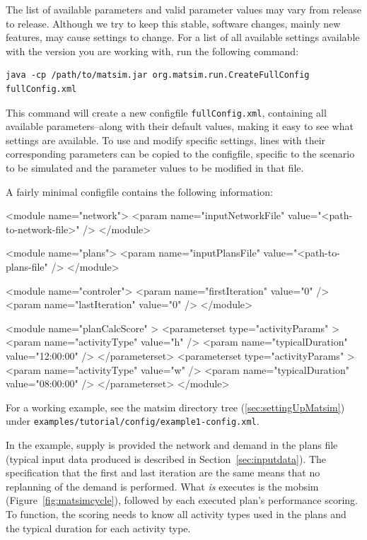 The list of available parameters and valid parameter values may vary from release to release. Although we try to keep this stable,
software changes, mainly new features, may cause settings to change. For a list of all available settings available with the version you are working with, run the following command:
\begin{lstlisting}
java -cp /path/to/matsim.jar org.matsim.run.CreateFullConfig fullConfig.xml
\end{lstlisting}
%
This command will create a new \gls{configfile} \lstinline|fullConfig.xml|, containing all available parameters--along with their default values, making it easy to see what settings are available. To use and modify specific settings, lines with their corresponding parameters can be copied to the \gls{configfile}, specific to the \gls{scenario} to be simulated and the parameter values to be modified in that file. 

A fairly minimal \gls{configfile} contains the following information:
\begin{xml}
<module name="network">
   <param name="inputNetworkFile" value="<path-to-network-file>" />
</module>

<module name="plans">
   <param name="inputPlansFile" value="<path-to-plans-file" />
</module>

<module name="controler">
   <param name="firstIteration" value="0" />
   <param name="lastIteration" value="0" />
</module>

<module name="planCalcScore" >
   <parameterset type="activityParams" >
      <param name="activityType" value="h" />
      <param name="typicalDuration" value="12:00:00" />
   </parameterset>
   <parameterset type="activityParams" >
      <param name="activityType" value="w" />
      <param name="typicalDuration" value="08:00:00" />
   </parameterset>
</module>
\end{xml}
For a working example, see the \gls{matsim} directory tree (\cf \ref{sec:settingUpMatsim}) under \lstinline{examples/tutorial/config/example1-config.xml}.
 
In the example, supply is provided 
the network and demand in the plans file (typical input data produced is described in Section~\ref{sec:inputdata}). 
%
The specification that the first and last iteration are the same means that no \gls{replanning} of the demand is performed.  
%
What \emph{is} executes is the \gls{mobsim} (Figure~\ref{fig:matsimcycle}), followed by each executed plan's performance scoring.
%
To function, the scoring needs to know all activity types used in the plans and the typical duration for each activity type.

